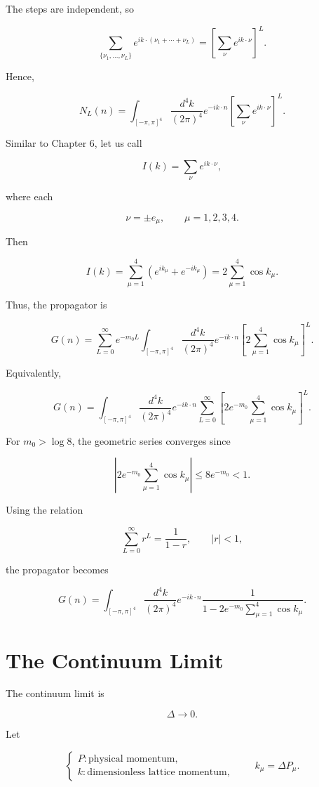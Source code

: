 \documentclass[12pt]{article}
\begin{document}
The steps are independent, so

\[
\sum_{\{\nu_1,\ldots,\nu_L\}}
e^{ik\cdot(\nu_1+\cdots+\nu_L)}
=
\left[
\sum_{\nu}e^{ik\cdot\nu}
\right]^L.
\]

Hence,

\[
N_L(n)
=
\int_{[-\pi,\pi]^4}
\frac{d^4k}{(2\pi)^4}
e^{-ik\cdot n}
\left[
\sum_{\nu}e^{ik\cdot\nu}
\right]^L.
\]

Similar to Chapter 6, let us call

\[
I(k)
=
\sum_{\nu}e^{ik\cdot\nu},
\]

where each

\[
\nu=\pm e_\mu,
\qquad
\mu=1,2,3,4.
\]

Then

\[
I(k)
=
\sum_{\mu=1}^{4}
\left(
e^{ik_\mu}+e^{-ik_\mu}
\right)
=
2\sum_{\mu=1}^{4}\cos k_\mu.
\]

Thus, the propagator is

\[
G(n)
=
\sum_{L=0}^{\infty}
e^{-m_0L}
\int_{[-\pi,\pi]^4}
\frac{d^4k}{(2\pi)^4}
e^{-ik\cdot n}
\left[
2\sum_{\mu=1}^{4}\cos k_\mu
\right]^L.
\]

Equivalently,

\[
G(n)
=
\int_{[-\pi,\pi]^4}
\frac{d^4k}{(2\pi)^4}
e^{-ik\cdot n}
\sum_{L=0}^{\infty}
\left[
2e^{-m_0}
\sum_{\mu=1}^{4}\cos k_\mu
\right]^L.
\]

For $m_0>\log 8$, the geometric series converges since

\[
\left|
2e^{-m_0}
\sum_{\mu=1}^{4}\cos k_\mu
\right|
\leq
8e^{-m_0}
<1.
\]

Using the relation

\[
\sum_{L=0}^{\infty}r^L
=
\frac{1}{1-r},
\qquad |r|<1,
\]

the propagator becomes

\[
\boxed{
G(n)
=
\int_{[-\pi,\pi]^4}
\frac{d^4k}{(2\pi)^4}
e^{-ik\cdot n}
\frac{1}{
1-
2e^{-m_0}
\displaystyle\sum_{\mu=1}^{4}\cos k_\mu
}.
}
\]

\section*{The Continuum Limit}

The continuum limit is

\[
\Delta\rightarrow 0.
\]

Let

\[
\begin{cases}
P: \text{physical momentum},\\[4pt]
k: \text{dimensionless lattice momentum},
\end{cases}
\qquad
k_\mu=\Delta P_\mu.
\]
\end{document}
